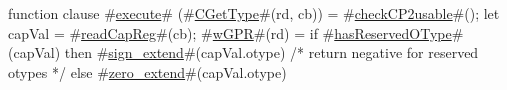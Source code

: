 function clause #\hyperref[zexecute]{execute}# (#\hyperref[zCGetType]{CGetType}#(rd, cb)) =
{
  #\hyperref[zcheckCP2usable]{checkCP2usable}#();
  let capVal = #\hyperref[zreadCapReg]{readCapReg}#(cb);
  #\hyperref[zwGPR]{wGPR}#(rd) = if #\hyperref[zhasReservedOType]{hasReservedOType}#(capVal)
    then #\hyperref[zsignzyextend]{sign\_extend}#(capVal.otype) /* return negative for reserved otypes */
    else #\hyperref[zzzerozyextend]{zero\_extend}#(capVal.otype)
}
